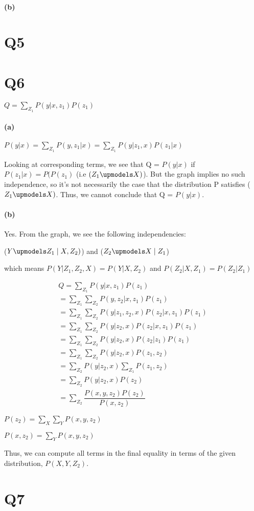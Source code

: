 \documentclass[11pt,a4paper]{article}
\begin{document}
\paragraph*{(b)}

\section*{Q5}

\section*{Q6}
$Q = \sum\limits_{Z_{1}}P(y|x,z_{1})P(z_{1})$
\paragraph*{(a)}
$P(y|x) = \sum\limits_{Z_{1}} P(y,z_{1}|x) = \sum\limits_{Z_{1}} P(y|z_{1},x)P(z_{1}|x)$

Looking at corresponding terms, we see that Q = $P(y|x)$ if $P(z_{1}|x) = P(P(z_{1})$ (i.e $(Z_{1} \upmodels X)$). But the graph implies no such independence, so it's not necessarily the case that the distribution P satisfies ($Z_{1} \upmodels X)$. Thus, we cannot conclude that Q = $P(y|x)$.

\paragraph*{(b)}
Yes. From the graph, we see the following independencies: 

($Y \upmodels Z_{1} \mid X, Z_{2})$) and ($Z_{2} \upmodels X \mid Z_{1}$)

which means $P(Y|Z_{1},Z_{2},X) = P(Y|X,Z_{2})$ and $P(Z_{2}|X,Z_{1}) = P(Z_{2}|Z_{1})$

\begin{equation*}
	\begin{aligned}
	Q = \sum\limits_{Z_{1}}P(y|x,z_{1})P(z_{1}) \\= 
\sum\limits_{Z_{1}} \sum\limits_{Z_{2}} P(y,z_{2}|x,z_{1})P(z_{1}) \\= 
\sum\limits_{Z_{1}} \sum\limits_{Z_{2}} P(y|z_{1},z_{2},x)P(z_{2}|x,z_{1})P(z_{1}) \\= 
\sum\limits_{Z_{1}} \sum\limits_{Z_{2}} P(y|z_{2},x)P(z_{2}|x,z_{1})P(z_{1}) \\= 
\sum\limits_{Z_{1}} \sum\limits_{Z_{2}} P(y|z_{2},x)P(z_{2}|z_{1})P(z_{1}) \\= 
\sum\limits_{Z_{1}} \sum\limits_{Z_{2}} P(y|z_{2},x)P(z_{1},z_{2}) \\= 
\sum\limits_{Z_{2}} P(y|z_{2},x) \sum\limits_{Z_{1}} P(z_{1},z_{2}) \\=
\sum\limits_{Z_{2}} P(y|z_{2},x)P(z_{2}) \\= 
\sum\limits_{Z_{2}} \dfrac{P(x,y,z_{2})P(z_{2})}{P(x,z_{2})}
	\end{aligned}
\end{equation*}

$P(z_{2}) = \sum\limits_{X} \sum\limits_{Y} P(x,y,z_{2})$

$P(x,z_{2}) = \sum\limits_{Y} P(x,y,z_{2})$

Thus, we can compute all terms in the final equality in terms of the given distribution, $P(X,Y,Z_{2})$.

\section*{Q7}
\end{document}
